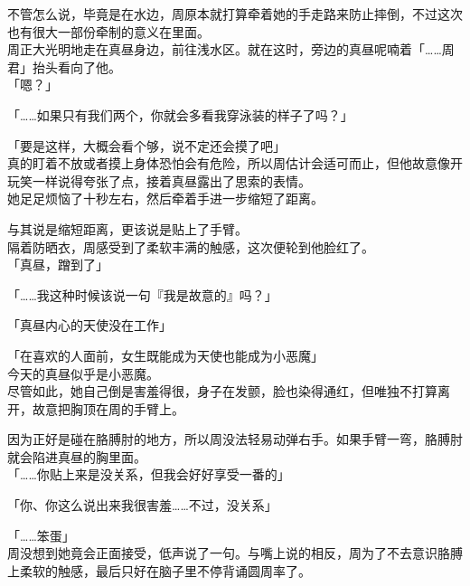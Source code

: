 不管怎么说，毕竟是在水边，周原本就打算牵着她的手走路来防止摔倒，不过这次也有很大一部份牵制的意义在里面。\\

周正大光明地走在真昼身边，前往浅水区。就在这时，旁边的真昼呢喃着「……周君」抬头看向了他。\\

「嗯？」

「……如果只有我们两个，你就会多看我穿泳装的样子了吗？」

「要是这样，大概会看个够，说不定还会摸了吧」\\

真的盯着不放或者摸上身体恐怕会有危险，所以周估计会适可而止，但他故意像开玩笑一样说得夸张了点，接着真昼露出了思索的表情。\\

她足足烦恼了十秒左右，然后牵着手进一步缩短了距离。

与其说是缩短距离，更该说是贴上了手臂。\\

隔着防晒衣，周感受到了柔软丰满的触感，这次便轮到他脸红了。\\

「真昼，蹭到了」

「……我这种时候该说一句『我是故意的』吗？」

「真昼内心的天使没在工作」

「在喜欢的人面前，女生既能成为天使也能成为小恶魔」\\

今天的真昼似乎是小恶魔。\\

尽管如此，她自己倒是害羞得很，身子在发颤，脸也染得通红，但唯独不打算离开，故意把胸顶在周的手臂上。

因为正好是碰在胳膊肘的地方，所以周没法轻易动弹右手。如果手臂一弯，胳膊肘就会陷进真昼的胸里面。\\

「……你贴上来是没关系，但我会好好享受一番的」

「你、你这么说出来我很害羞……不过，没关系」

「……笨蛋」\\

周没想到她竟会正面接受，低声说了一句。与嘴上说的相反，周为了不去意识胳膊上柔软的触感，最后只好在脑子里不停背诵圆周率了。
